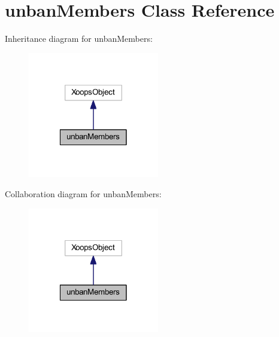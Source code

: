 \hypertarget{classunban_members}{\section{unban\-Members Class Reference}
\label{classunban_members}
}


Inheritance diagram for unban\-Members\-:
\nopagebreak
\begin{figure}[H]
\begin{center}
\leavevmode
\includegraphics[width=162pt]{classunban_members__inherit__graph}
\end{center}
\end{figure}


Collaboration diagram for unban\-Members\-:
\nopagebreak
\begin{figure}[H]
\begin{center}
\leavevmode
\includegraphics[width=162pt]{classunban_members__coll__graph}
\end{center}
\end{figure}
